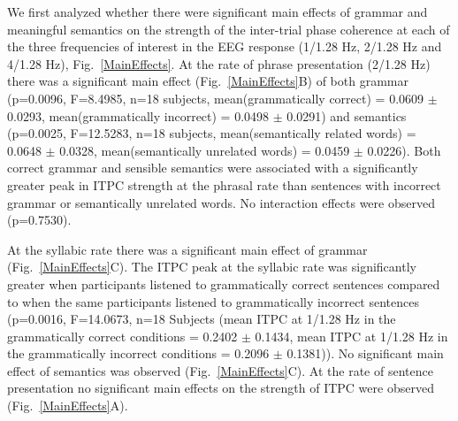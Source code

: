 \documentclass[a4paper,10pt,twoside]{article}
\begin{document}
We first analyzed whether there were significant main effects of grammar and meaningful semantics on the strength of the inter-trial phase coherence at each of the three frequencies of interest in the EEG response (1/1.28 Hz, 2/1.28 Hz and 4/1.28 Hz), Fig.~\ref{MainEffects}. At the rate of phrase presentation (2/1.28 Hz) there was a significant main effect (Fig.~\ref{MainEffects}B) of both grammar (p=0.0096, F=8.4985, n=18 subjects, mean(grammatically correct) =  0.0609 $\pm$ 0.0293, mean(grammatically incorrect) = 0.0498 $\pm$ 0.0291) and semantics (p=0.0025, F=12.5283, n=18 subjects, mean(semantically related words) = 0.0648 $\pm$ 0.0328, mean(semantically unrelated words) = 0.0459 $\pm$ 0.0226). Both correct grammar and sensible semantics were associated with a significantly greater peak in ITPC strength at the phrasal rate than sentences with incorrect grammar or semantically unrelated words. No interaction effects were observed (p=0.7530).

At the syllabic rate there was a significant main effect of grammar (Fig.~\ref{MainEffects}C). The ITPC peak at the syllabic rate was significantly greater when participants listened to grammatically correct sentences compared to when the same participants listened to grammatically incorrect sentences (p=0.0016, F=14.0673, n=18 Subjects (mean ITPC at 1/1.28 Hz in the grammatically correct conditions = 0.2402 $\pm$ 0.1434, mean ITPC at 1/1.28 Hz in the grammatically incorrect conditions = 0.2096 $\pm$ 0.1381)). No significant main effect of semantics was observed (Fig.~\ref{MainEffects}C). At the rate of sentence presentation no significant main effects on the strength of ITPC were observed (Fig.~\ref{MainEffects}A).


\end{document}
